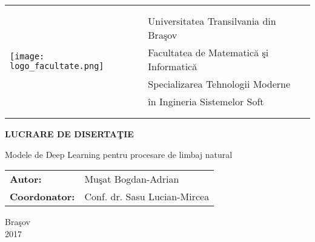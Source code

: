 \begin{titlepage}
	\begin{center}
		\vspace*{-2cm}

		\Large
		\begin{tabular}{ll}
			\multirow{8}{*}{\texttt{[image: logo\_facultate.png]}}
			&\\
			&\\
			&Universitatea Transilvania din Bra\c sov\\
			&Facultatea de Matematic\u a \c si Informatic\u a\\
			&Specializarea Tehnologii Moderne \\
			& \^ in Ingineria Sistemelor Soft\\
			&\\
			&\\
		\end{tabular}

		\vspace{1.5cm}
					
		\Huge
		\textbf{LUCRARE DE DISERTA\c TIE}
		
		\vspace{1cm}
		
		\LARGE
		Modele de Deep Learning pentru procesare de limbaj natural
		
		\vspace{5cm}
				
		\Large
		\begin{tabular}{ll}
			\textbf{Autor:}&Mu\c sat Bogdan-Adrian\\
			\textbf{Coordonator:}&Conf. dr. Sasu Lucian-Mircea
		\end{tabular}
		
		\vfill
		
		\Large
		Bra\c sov\\
		2017
        
	\end{center}
\end{titlepage}